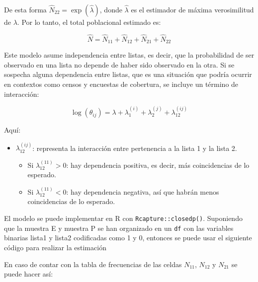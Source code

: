 \documentclass[
  12pt,
]{book}
\newenvironment{Shaded}{\begin{snugshade}}{\end{snugshade}}
\newcommand{\FunctionTok}[1]{\textcolor[rgb]{0.13,0.29,0.53}{\textbf{#1}}}
\newcommand{\NormalTok}[1]{#1}
\newcommand{\SpecialCharTok}[1]{\textcolor[rgb]{0.81,0.36,0.00}{\textbf{#1}}}
\providecommand{\tightlist}{%
  \setlength{\itemsep}{0pt}\setlength{\parskip}{0pt}}
\begin{document}
De esta forma \(\hat{N}_{22}=\exp(\hat{\lambda})\), donde \(\hat{\lambda}\) es el estimador de máxima verosimilitud de \(\lambda\). Por lo tanto, el total poblacional estimado es:

\[\hat{N} = \hat{N}_{11} + \hat{N}_{12} + \hat{N}_{21} + \hat{N}_{22}\]

Este modelo asume independencia entre listas, es decir, que la probabilidad de ser observado en una lista no depende de haber sido observado en la otra. Si se sospecha alguna dependencia entre listas, que es una situación que podría ocurrir en contextos como censos y encuestas de cobertura, se incluye un término de interacción:

\[
\log(\theta_{ij}) = \lambda + \lambda_1^{(i)} + \lambda_2^{(j)} + \lambda_{12}^{(ij)}
\]

Aquí:

\begin{itemize}
\tightlist
\item
  \(\lambda_{12}^{(ij)}\): representa la interacción entre pertenencia a la lista 1 y la lista 2.

  \begin{itemize}
  \tightlist
  \item
    Si \(\lambda_{12}^{(11)} > 0\): hay dependencia positiva, es decir, más coincidencias de lo esperado.
  \item
    Si \(\lambda_{12}^{(11)} < 0\): hay dependencia negativa, así que habrán menos coincidencias de lo esperado.
  \end{itemize}
\end{itemize}

El modelo se puede implementar en R con \texttt{Rcapture::closedp()}. Suponiendo que la muestra E y muestra P se han organizado en un \texttt{df} con las variables binarias lista1 y lista2 codificadas como 1 y 0, entonces se puede usar el siguiente código para realizar la estimación

\begin{Shaded}
\end{Shaded}

En caso de contar con la tabla de frecuencias de las celdas \(N_{11}\), \(N_{12}\) y \(N_{21}\) se puede hacer así:
\end{document}

